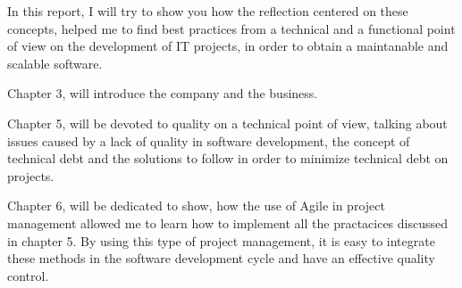 In this report, I will try to show you how the reflection centered on these concepts, helped me to find best practices from a technical and a functional point of view on the development of IT projects, in order to obtain a maintanable and scalable software. 

Chapter 3, will introduce the company and the business. 

Chapter 5, will be devoted to quality on a technical point of view, talking about issues caused by a lack of quality in software development, the concept of technical debt and the solutions to follow in order to minimize technical debt on projects. 

Chapter 6, will be dedicated to show, how the use of Agile in project management allowed me to learn how to implement all the practacices discussed in chapter 5. 
By using this type of project management, it is easy to integrate these methods in the software development cycle and have an effective quality control. 